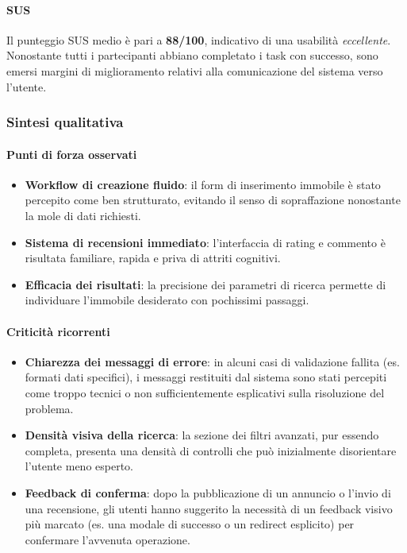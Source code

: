 \documentclass[a4paper,11pt]{report}
\begin{document}
\paragraph{SUS} Il punteggio SUS medio è pari a \textbf{88/100}, indicativo di una usabilità \emph{eccellente}. Nonostante tutti i partecipanti abbiano completato i task con successo, sono emersi margini di miglioramento relativi alla comunicazione del sistema verso l'utente.

\subsubsection*{Sintesi qualitativa}

\paragraph{Punti di forza osservati}
\begin{itemize}[nosep]
  \item \textbf{Workflow di creazione fluido}: il form di inserimento immobile è stato percepito come ben strutturato, evitando il senso di sopraffazione nonostante la mole di dati richiesti.
  \item \textbf{Sistema di recensioni immediato}: l'interfaccia di rating e commento è risultata familiare, rapida e priva di attriti cognitivi.
  \item \textbf{Efficacia dei risultati}: la precisione dei parametri di ricerca permette di individuare l'immobile desiderato con pochissimi passaggi.
\end{itemize}

\paragraph{Criticità ricorrenti}
\begin{itemize}[nosep]
  \item \textbf{Chiarezza dei messaggi di errore}: in alcuni casi di validazione fallita (es. formati dati specifici), i messaggi restituiti dal sistema sono stati percepiti come troppo tecnici o non sufficientemente esplicativi sulla risoluzione del problema.
  \item \textbf{Densità visiva della ricerca}: la sezione dei filtri avanzati, pur essendo completa, presenta una densità di controlli che può inizialmente disorientare l'utente meno esperto.
  \item \textbf{Feedback di conferma}: dopo la pubblicazione di un annuncio o l'invio di una recensione, gli utenti hanno suggerito la necessità di un feedback visivo più marcato (es. una modale di successo o un redirect esplicito) per confermare l'avvenuta operazione.
\end{itemize}
\end{document}
